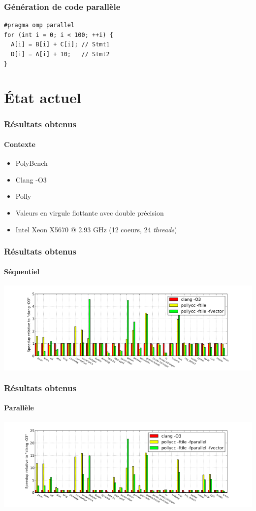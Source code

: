 \documentclass{beamer}
\begin{document}
\begin{frame}[fragile]
\frametitle{Génération de code parallèle}
\begin{lstlisting}
#pragma omp parallel
for (int i = 0; i < 100; ++i) {
  A[i] = B[i] + C[i]; // Stmt1
  D[i] = A[i] + 10;   // Stmt2
}
\end{lstlisting}
\end{frame}

\section{État actuel}
\begin{frame}
\frametitle{Résultats obtenus}
\framesubtitle{Contexte}
\begin{itemize}
\item PolyBench
\item Clang -O3
\item Polly
\item Valeurs en virgule flottante avec double précision
\item Intel Xeon X5670 @ 2.93 GHz (12 coeurs, 24 \textit{threads})
\end{itemize}
\end{frame}

\begin{frame}
\frametitle{Résultats obtenus}
\framesubtitle{Séquentiel}
\begin{center}
\colorbox{white}{\includegraphics[scale=0.36]{sequential-small.png}}
\end{center}
\end{frame}

\begin{frame}
\frametitle{Résultats obtenus}
\framesubtitle{Parallèle}
\begin{center}
\colorbox{white}{\includegraphics[scale=0.36]{parallel-small.png}}
\end{center}
\end{frame}
\end{document}
